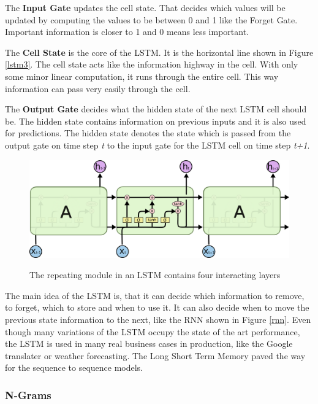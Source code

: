 The \textbf{Input Gate} updates the cell state. That decides which values will be updated by computing the values to be between 0 and 1 like the Forget Gate. Important information is closer to 1 and 0 means less important.

The \textbf{Cell State} is the core of the LSTM. It is the horizontal line shown in Figure \ref{lstm3}. The cell state acts like the information highway in the cell. With only some minor linear computation, it runs through the entire cell. This way information can pass very easily through the cell. 

The \textbf{Output Gate} decides what the hidden state of the next LSTM cell should be. The hidden state contains information on previous inputs and it is also used for predictions. The hidden state denotes the state which is passed from the output gate on time step \textit{t} to the input gate for the LSTM cell on time step \textit{t+1}.


\begin{figure}
	\begin{center}
		\includegraphics[width=4.5in]{photos/LSTM3-chain}\\
		\caption{The repeating module in an LSTM contains four interacting layers \cite{olah}}\label{lstm2}
	\end{center}
\end{figure}

The main idea of the LSTM is, that it can decide which information to remove, to forget, which to store and when to use it. It can also decide when to move the previous state information to the next, like the RNN shown in Figure \ref{rnn}. Even though many variations of the LSTM occupy the state of the art performance, the LSTM is used in many real business cases in production, like the Google translater or weather forecasting.
The Long Short Term Memory paved the way for the sequence to sequence models.
\subsubsection{N-Grams}\label{ss:ngram}

